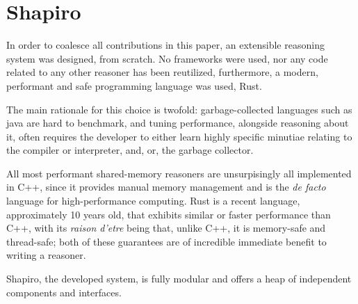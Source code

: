 \documentclass[manuscript,screen,review]{acmart}
\theoremstyle{definition}
\begin{document}
\section{Shapiro}
In order to coalesce all contributions in this paper, an extensible reasoning system was designed, from scratch. No frameworks
were used, nor any code related to any other reasoner has been reutilized, furthermore, a modern, performant and safe programming
language was used, Rust\cite{rust_lang}.

The main rationale for this choice is twofold: garbage-collected languages such as java are hard to benchmark, and tuning
performance, alongside reasoning about it, often requires the developer to either learn highly specific minutiae relating
to the compiler or interpreter, and, or, the garbage collector.

All most performant shared-memory reasoners are unsurpisingly all implemented in C++\cite{rdfox, vadalog, souffle}, since
it provides manual memory management and is the \textit{de facto} language for high-performance computing. Rust is a
recent language, approximately 10 years old, that exhibits similar or faster performance than C++, with its \textit{raison d'etre}
being that, unlike C++, it is memory-safe and thread-safe\cite{rust2014,rustbelt,rustsafety}; both of these guarantees are
of incredible immediate benefit to writing a reasoner.

Shapiro, the developed system, is fully modular and offers a heap of independent components and interfaces.
\end{document}
